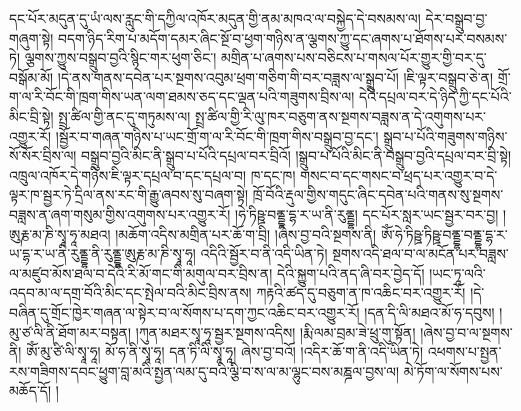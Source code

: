 དང་པོར་མདུན་དུ་ཡཾ་ལས་རླུང་གི་དཀྱིལ་འཁོར་མདུན་གྱི་ནམ་མཁའ་ལ་བསྐྱེད་དེ་བསམས་ལ། དེར་བསྒྲུབ་བྱ་གཞུག་སྟེ། བདག་ཉིད་རིག་པ་མདོག་དམར་ཞིང་སྔོ་བ་ཕྱག་གཉིས་ན་ལྕགས་ཀྱུ་དང་ཞགས་པ་ཐོགས་པར་བསམས་ཏེ། ལྕགས་ཀྱུས་བསྒྲུབ་བྱའི་སྙིང་གར་ཕུག་ཅིང་། མགྲིན་པ་ཞགས་པས་བཅིངས་པ་གསལ་པོར་གྱུར་གྱི་བར་དུ་བསྒོམ་མོ། །དེ་ནས་གནས་དབེན་པར་སྔགས་འབུམ་ཕྲག་གཅིག་གི་བར་བཟླས་ལ་སྒྲུབ་པོ། །ཇི་ལྟར་བསྒྲུབ་ཅེ་ན། གྲོ་ག་ལ་རི་བོང་གི་ཁྲག་གིས་ཡན་ལག་ཐམས་ཅད་དང་ལྡན་པའི་གཟུགས་བྲིས་ལ། དེའི་དཔྲལ་བར་དེ་ཉིད་ཀྱི་དང་པོའི་མིང་བྲི་སྟེ། སྤྲ་ཚིལ་གྱི་ནང་དུ་གཏུམས་ལ། སྤྲ་ཚིལ་གྱི་རི་ལུ་ཁར་བཅུག་ནས་སྔགས་བཟླས་ན་དེ་འགུགས་པར་འགྱུར་རོ། །སྦྱོར་བ་གཞན་གཉིས་པ་ཡང་གྲོ་ག་ལ་རི་བོང་གི་ཁྲག་གིས་བསྒྲུབ་བྱ་དང་། སྒྲུབ་པ་པོའི་གཟུགས་གཉིས་སོ་སོར་བྲིས་ལ། བསྒྲུབ་བྱའི་མིང་ནི་སྒྲུབ་པ་པོའི་དཔྲལ་བར་བྲིའོ། །སྒྲུབ་པ་པོའི་མིང་ནི་བསྒྲུབ་བྱའི་དཔྲལ་བར་བྲི་སྟེ། འཁྲུལ་འཁོར་དེ་གཉིས་ཇི་ལྟར་དཔྲལ་བ་དང་དཔྲལ་བ། ཁ་དང་ཁ། གསང་བ་དང་གསང་བ་ཕྲད་པར་འགྱུར་བ་དེ་ལྟར་ཁ་སྦྱར་ཏེ་དྲིལ་ནས་རང་གི་རྒྱུ་ཞབས་སུ་བཞག་སྟེ། ཁྲོ་བོའི་རྡུལ་གྱིས་གདུང་ཞིང་དབེན་པའི་གནས་སུ་སྔགས་བཟླས་ན་ཞག་གསུམ་གྱིས་འགུགས་པར་འགྱུར་རོ། །ཧེ་ཏིཥྛ་བནྡྷ་དྷ་ར་ཡ་ནི་རུནྡྷ། དང་པོར་སླར་ཡང་སྦྱར་བར་བྱ། །ཨུརྞ་མ་ཎི་སྭཱ་ཧཱ་མཐའ། །མཆོག་འདིས་མགྲིན་པར་ཆོ་ག་བྲི། །ཞེས་བྱ་བའི་སྔགས་ནི། ཨོཾ་ཧེ་ཏིཥྛ་ཏིཥྛ་བནྡྷ་བནྡྷ་དྷ་ར་ཡ་དྷ་ར་ཡ་ནི་རུནྡྷ་ནི་རུནྡྷ་ཨུརྞ་མ་ཎི་སྭཱ་ཧཱ། འདིའི་སྦྱོར་བ་ནི་འདི་ཡིན་ཏེ། སྔགས་འདི་ཐལ་བ་ལ་མངོན་པར་བཟླས་ལ་མཛུབ་མོས་ཐལ་བ་དེའི་རི་མོ་གང་གི་མགུལ་བར་བྲིས་ན། དེའི་སྐྱུག་པའི་ནད་ཞི་བར་བྱེད་དོ། །ཡང་ཏཱ་ལའི་འདབ་མ་ལ་དགྲ་བོའི་མིང་དང་སྤེལ་བའི་མིང་བྲིས་ནས། ཀརྟའི་ཚད་དུ་བཅུག་ན་ཁ་འཆིང་བར་འགྱུར་རོ། །དེ་བཞིན་དུ་གྲོང་ཁྱེར་གཞན་ལ་སྟེར་བ་ལ་སོགས་པ་དག་ཀྱང་འཆིང་བར་འགྱུར་རོ། །དན་དི་ལི་མཐའ་མོ་ཧ་དབུས། །མུ་ཙ་ལི་ནི་ཐོག་མར་བསྟན། །ཀུན་མཐར་སྭཱ་ཧཱ་སྦྱར་སྔགས་འདིས། །རྨི་ལམ་བྲམ་ཟེ་ཕྲུ་གུ་སྟོན། །ཞེས་བྱ་བ་ལ་སྔགས་ནི། ཨོཾ་མུ་ཙི་ལི་སྭཱ་ཧཱ། མོ་ཧ་ནི་སྭཱ་ཧཱ། དན་ཏི་ལི་སྭཱ་ཧཱ། ཞེས་བྱ་བའོ། །འདིར་ཆོ་ག་ནི་འདི་ཡིན་ཏེ། འཕགས་པ་སྤྱན་རས་གཟིགས་དབང་ཕྱུག་བླ་མའི་སྤྱན་ལམ་དུ་བའི་ལྕི་བ་ས་ལ་མ་ལྷུང་བས་མཎྜལ་བྱས་ལ། མེ་ཏོག་ལ་སོགས་པས་མཆོད་དོ། །
